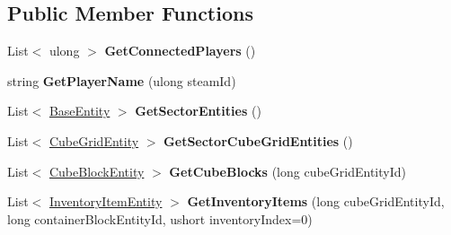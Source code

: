 \subsection*{Public Member Functions}
\begin{DoxyCompactItemize}
\item 
\hypertarget{class_s_e_mod_a_p_i_extensions_1_1_a_p_i_1_1_i_p_c_1_1_internal_service_a1a1e01b2163660cfe7eae441d6b2d2c4}{}List$<$ ulong $>$ {\bfseries Get\+Connected\+Players} ()\label{class_s_e_mod_a_p_i_extensions_1_1_a_p_i_1_1_i_p_c_1_1_internal_service_a1a1e01b2163660cfe7eae441d6b2d2c4}

\item 
\hypertarget{class_s_e_mod_a_p_i_extensions_1_1_a_p_i_1_1_i_p_c_1_1_internal_service_a705a5ddab90b51d87e960917eeccbecd}{}string {\bfseries Get\+Player\+Name} (ulong steam\+Id)\label{class_s_e_mod_a_p_i_extensions_1_1_a_p_i_1_1_i_p_c_1_1_internal_service_a705a5ddab90b51d87e960917eeccbecd}

\item 
\hypertarget{class_s_e_mod_a_p_i_extensions_1_1_a_p_i_1_1_i_p_c_1_1_internal_service_a5f8e03080580ca038e1a721281637abe}{}List$<$ \hyperlink{class_s_e_mod_a_p_i_internal_1_1_a_p_i_1_1_entity_1_1_base_entity}{Base\+Entity} $>$ {\bfseries Get\+Sector\+Entities} ()\label{class_s_e_mod_a_p_i_extensions_1_1_a_p_i_1_1_i_p_c_1_1_internal_service_a5f8e03080580ca038e1a721281637abe}

\item 
\hypertarget{class_s_e_mod_a_p_i_extensions_1_1_a_p_i_1_1_i_p_c_1_1_internal_service_a43036c0032b5fb2a41697eb9160b363e}{}List$<$ \hyperlink{class_s_e_mod_a_p_i_internal_1_1_a_p_i_1_1_entity_1_1_sector_1_1_sector_object_1_1_cube_grid_entity}{Cube\+Grid\+Entity} $>$ {\bfseries Get\+Sector\+Cube\+Grid\+Entities} ()\label{class_s_e_mod_a_p_i_extensions_1_1_a_p_i_1_1_i_p_c_1_1_internal_service_a43036c0032b5fb2a41697eb9160b363e}

\item 
\hypertarget{class_s_e_mod_a_p_i_extensions_1_1_a_p_i_1_1_i_p_c_1_1_internal_service_a53272380b3e865ae0f1c9149618ede43}{}List$<$ \hyperlink{class_s_e_mod_a_p_i_internal_1_1_a_p_i_1_1_entity_1_1_sector_1_1_sector_object_1_1_cube_grid_1_1_cube_block_entity}{Cube\+Block\+Entity} $>$ {\bfseries Get\+Cube\+Blocks} (long cube\+Grid\+Entity\+Id)\label{class_s_e_mod_a_p_i_extensions_1_1_a_p_i_1_1_i_p_c_1_1_internal_service_a53272380b3e865ae0f1c9149618ede43}

\item 
\hypertarget{class_s_e_mod_a_p_i_extensions_1_1_a_p_i_1_1_i_p_c_1_1_internal_service_a721f535a08b3350cdbc57b7ca36007c5}{}List$<$ \hyperlink{class_s_e_mod_a_p_i_internal_1_1_a_p_i_1_1_entity_1_1_inventory_item_entity}{Inventory\+Item\+Entity} $>$ {\bfseries Get\+Inventory\+Items} (long cube\+Grid\+Entity\+Id, long container\+Block\+Entity\+Id, ushort inventory\+Index=0)\label{class_s_e_mod_a_p_i_extensions_1_1_a_p_i_1_1_i_p_c_1_1_internal_service_a721f535a08b3350cdbc57b7ca36007c5}


\end{DoxyCompactItemize}
